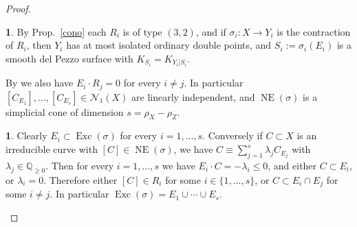 \documentclass[a4paper,12pt]{amsart}
\theoremstyle{definition}
\newtheorem{prg}[thm]{}
\numberwithin{figure}{section}
\numberwithin{table}{section}
\newcommand{\Q}{\mathbb{Q}}
\newcommand{\N}{\mathcal{N}_1}
\newcommand{\NE}{\operatorname{NE}}
\newcommand{\Exc}{\operatorname{Exc}}
\begin{document}
\begin{proof}
  \begin{prg}\label{Si}
 By Prop.~\ref{cono} each $R_i$ is of type $(3,2)$, and
if $\sigma_i\colon X\to Y_i$ is the contraction of $R_i$, then $Y_i$ has at most isolated ordinary double points, and $S_i:=\sigma_i(E_i)$ is a smooth del Pezzo surface with $K_{S_i}=K_{Y_i|S_i}$. 

By \cite[Lemma 2.5]{32} we also have   $E_{i}\cdot R_j=0$ for every $i\neq j$. In particular $[C_{E_1}],\dotsc,[C_{E_s}]\in\N(X)$ are linearly independent, and 
   $\NE(\sigma)$ is a simplicial cone of dimension $s=\rho_X-\rho_Z$.
\end{prg}
\begin{prg}\label{NE}
   Clearly $E_i\subset\Exc(\sigma)$ for every $i=1,\dotsc,s$. Conversely if $C\subset X$ is an irreducible curve with $[C]\in\NE(\sigma)$,
we have $C\equiv\sum_{j=1}^s\lambda_j C_{E_j}$ with $\lambda_j\in\Q_{\geq 0}$.
Then for every $i=1,\dotsc,s$ we have $E_i\cdot C=-\lambda_i\leq 0$, and either $C\subset E_i$, or $\lambda_i=0$. Therefore 
either $[C]\in R_i$ for some $i\in\{1,\dotsc,s\}$, or $C\subset E_i\cap E_j$ for some $i\neq j$. In particular  $\Exc(\sigma)=E_1\cup\cdots \cup E_{s}$.


\end{prg}
\end{proof}
\end{document}
